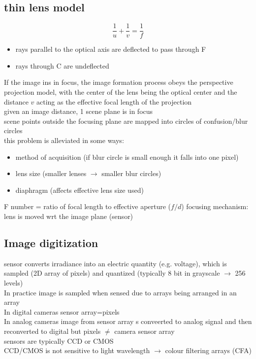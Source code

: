 \documentclass{article}
\begin{document}
\subsection{thin lens model}
\begin{equation}
	\frac{1}{u}+\frac{1}{v}=\frac{1}{f}
\end{equation}
\begin{itemize}
	\item rays parallel to the optical axis are deflected to pass through F
	\item rays through C are undeflected
\end{itemize}
If the image ins in focus, the image formation process obeys the perspective projection model, with the center of the lens being the optical center and the distance $v$ acting as the effective focal length of the projection\\
given an image distance, 1 scene plane is in focus\\
scene points outside the focusing plane are mapped into circles of confusion/blur circles\\
this problem is alleviated in some ways: 
\begin{itemize}
	\item method of acquisition (if blur circle is small enough it falls into one pixel)
	\item lens size (smaller lenses $\rightarrow$ smaller blur circles)
	\item diaphragm (affects effective lens size used)
\end{itemize}
F number = ratio of focal length to effective aperture ($f/d$)
focusing mechanism: lens is moved wrt the image plane (sensor)

\subsection{Image digitization}
sensor converts irradiance into an electric quantity (e.g. voltage), which is sampled (2D array of pixels) and quantized (typically 8 bit in grayscale $\rightarrow$ 256 levels)\\
In practice image is sampled when sensed due to arrays being arranged in an array\\
In digital cameras sensor array=pixels\\
In analog cameras image from sensor array s conveerted to analog signal and then reconverted to digital but pixels $\neq$ camera sensor array\\
sensors are typically CCD or CMOS\\
CCD/CMOS is not sensitive to light wavelength $\rightarrow$ colour filtering arrays (CFA)
\end{document}
